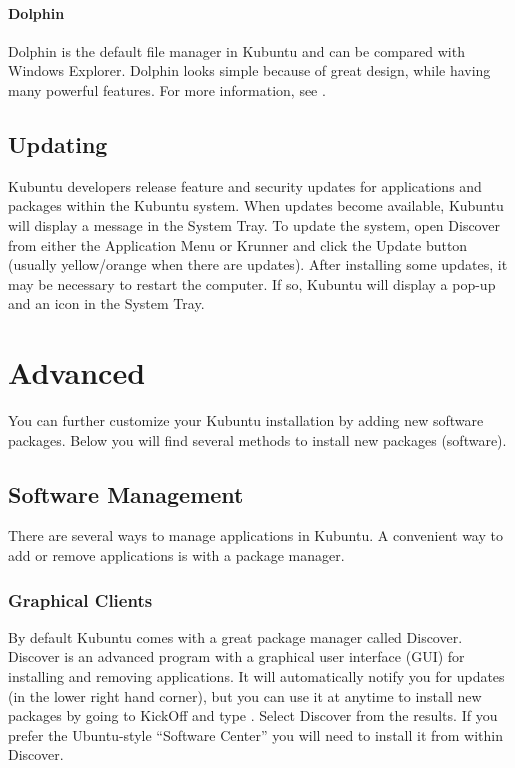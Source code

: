 \documentclass[letterpaper,10pt,english]{sphinxmanual}
\begin{document}
\subsubsection{Dolphin}
\label{\detokenize{docs/basic:dolphin}}
Dolphin is the default file manager in Kubuntu and can be compared with Windows Explorer. Dolphin looks simple because of great design, while having many powerful features. For more information, see .


\section{Updating}
\label{\detokenize{docs/basic:updating}}
Kubuntu developers release feature and security updates for applications and packages within the Kubuntu system. When updates become available, Kubuntu will display a message in the System Tray. To update the system, open Discover from either the Application Menu or Krunner and click the Update button (usually yellow/orange when there are updates). After installing some updates, it may be necessary to restart the computer. If so, Kubuntu will display a pop-up and an icon in the System Tray.

{\hyperref[\detokenize{docs/basic:basic}]{}}


\chapter{Advanced}
\label{\detokenize{docs/advanced:advanced}}\label{\detokenize{docs/advanced:advanced-link}}\label{\detokenize{docs/advanced::doc}}
You can further customize your Kubuntu installation by adding new software packages. Below you will find several methods to install new packages (software).


\section{Software Management}
\label{\detokenize{docs/advanced:software-management}}
There are several ways to manage applications in Kubuntu. A convenient way to add or remove applications is with a package manager.


\subsection{Graphical Clients}
\label{\detokenize{docs/advanced:graphical-clients}}
By default Kubuntu comes with a great package manager called Discover. Discover is an advanced program with a graphical user interface (GUI) for installing and removing applications. It will automatically notify you for updates (in the lower right hand corner), but you can use it at anytime to install new packages by going to KickOff and type . Select  Discover from the results. If you prefer the Ubuntu-style “Software Center” you will need to install it from within Discover.
\end{document}
